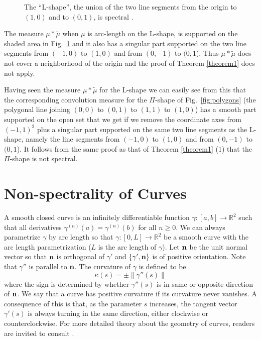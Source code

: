 \documentclass[12pt,a4paper,oneside]{amsart}
\theoremstyle{definition}
\newcommand{\RR}{{\mathbb R}}
\newcommand{\wt}[1]{\widetilde{#1}}
\newcounter{rem}
\begin{document}
\begin{figure}[h]
\ifdefined\SMART\resizebox{4cm}{!}{}\else

\fi
\caption{The ``L-shape'', the union of the two line segments from the origin to $(1, 0)$ and to $(0, 1)$, is spectral \cite{lai2021spectral}.}\label{fig:l-shape}
\end{figure}

 The measure $\mu*\wt \mu$ when $\mu$ is arc-length on the L-shape, is supported on the shaded area in Fig.\ \ref{fig:l-shape} and it also has a singular part supported on the two line segments from $(-1, 0)$ to $(1, 0)$ and from $(0, -1)$ to $(0, 1$). Thus $\mu*\wt \mu$ does not cover a neighborhood of the origin and the proof of Theorem \ref{theorem1} does not apply.

 Having seen the measure $\mu*\wt \mu$ for the L-shape we can easily see from this that the corresponding convolution measure for the $\Pi$-shape of Fig.\ \ref{fig:polygons} (the polygonal line joining $(0, 0)$ to $(0, 1)$ to $(1, 1)$ to $(1, 0)$) has a smooth part supported on the open set that we get if we remove the coordinate axes from $(-1, 1)^2$ plus a singular part supported on the same two line segments as the L-shape, namely the line segments from $(-1, 0)$ to $(1, 0)$ and from $(0, -1)$ to $(0, 1$). It follows from the same proof as that of Theorem \ref{theorem1} (1) that the $\Pi$-shape is not spectral.

\section{Non-spectrality of Curves}\label{Section-curves}


A smooth closed curve is an infinitely differentiable function $\gamma: [a,b]\to \RR^2$ such that all derivatives $\gamma^{(n)}(a) = \gamma^{(n)}(b)$ for all $n\ge 0$.  We can always parametrize $\gamma$ by arc length so that  $\gamma:[0,L]\to \RR^2$ be a smooth curve with the arc length parametrization ($L$ is the arc length of $\gamma$). Let ${\bf n}$ be the unit normal vector so that ${\bf n}$ is orthogonal of $\gamma'$ and $\{\gamma',{\bf n}\}$ is of positive orientation. Note that $\gamma''$ is parallel to ${\bf n}$.  The curvature of $\gamma$ is defined to be 
$$
\kappa(s) = \pm \|\gamma''(s)\|
$$
where the sign  is determined by whether $\gamma''(s)$ is in same or opposite direction of ${\bf n}$. We say that a curve has positive curvature if its curvature never vanishes. A consequence of this is that, as the parameter $s$ increases, the tangent vector $\gamma'(s)$ is always turning in the same direction, either clockwise or counterclockwise. For more detailed theory about the geometry of curves, readers are invited to consult \cite{docarmo}.  
\end{document}
